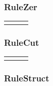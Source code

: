 \documentclass[12pt]{article}
\begin{document}
\subsubsection*{RuleZer}

\begin{tabularx}{\linewidth}{CCC}
&
&
\end{tabularx}


\subsubsection*{RuleCut}

\begin{tabularx}{\linewidth}{CCC}
\end{tabularx}


\subsubsection*{RuleStruct}
\end{document}
